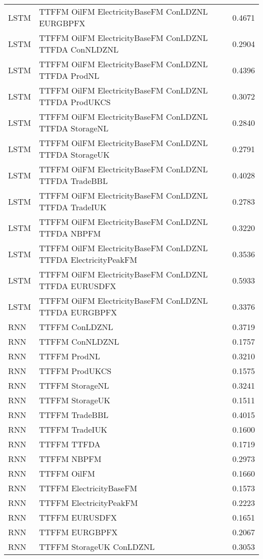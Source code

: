 \begin{table}[h!]
\begin{adjustbox}{max width=\textwidth}
\begin{tabular}{llr}
  LSTM & TTFFM OilFM ElectricityBaseFM ConLDZNL EURGBPFX & 0.4671 \\ 
  LSTM & TTFFM OilFM ElectricityBaseFM ConLDZNL TTFDA ConNLDZNL & 0.2904 \\ 
  LSTM & TTFFM OilFM ElectricityBaseFM ConLDZNL TTFDA ProdNL & 0.4396 \\ 
  LSTM & TTFFM OilFM ElectricityBaseFM ConLDZNL TTFDA ProdUKCS & 0.3072 \\ 
  LSTM & TTFFM OilFM ElectricityBaseFM ConLDZNL TTFDA StorageNL & 0.2840 \\ 
  LSTM & TTFFM OilFM ElectricityBaseFM ConLDZNL TTFDA StorageUK & 0.2791 \\ 
  LSTM & TTFFM OilFM ElectricityBaseFM ConLDZNL TTFDA TradeBBL & 0.4028 \\ 
  LSTM & TTFFM OilFM ElectricityBaseFM ConLDZNL TTFDA TradeIUK & 0.2783 \\ 
  LSTM & TTFFM OilFM ElectricityBaseFM ConLDZNL TTFDA NBPFM & 0.3220 \\ 
  LSTM & TTFFM OilFM ElectricityBaseFM ConLDZNL TTFDA ElectricityPeakFM & 0.3536 \\ 
  LSTM & TTFFM OilFM ElectricityBaseFM ConLDZNL TTFDA EURUSDFX & 0.5933 \\ 
  LSTM & TTFFM OilFM ElectricityBaseFM ConLDZNL TTFDA EURGBPFX & 0.3376 \\ 
  RNN & TTFFM ConLDZNL & 0.3719 \\ 
  RNN & TTFFM ConNLDZNL & 0.1757 \\ 
  RNN & TTFFM ProdNL & 0.3210 \\ 
  RNN & TTFFM ProdUKCS & 0.1575 \\ 
  RNN & TTFFM StorageNL & 0.3241 \\ 
  RNN & TTFFM StorageUK & 0.1511 \\ 
  RNN & TTFFM TradeBBL & 0.4015 \\ 
  RNN & TTFFM TradeIUK & 0.1600 \\ 
  RNN & TTFFM TTFDA & 0.1719 \\ 
  RNN & TTFFM NBPFM & 0.2973 \\ 
  RNN & TTFFM OilFM & 0.1660 \\ 
  RNN & TTFFM ElectricityBaseFM & 0.1573 \\ 
  RNN & TTFFM ElectricityPeakFM & 0.2223 \\ 
  RNN & TTFFM EURUSDFX & 0.1651 \\ 
  RNN & TTFFM EURGBPFX & 0.2067 \\ 
  RNN & TTFFM StorageUK ConLDZNL & 0.3053 \\ 

\end{tabular}
\end{adjustbox}
\end{table}
